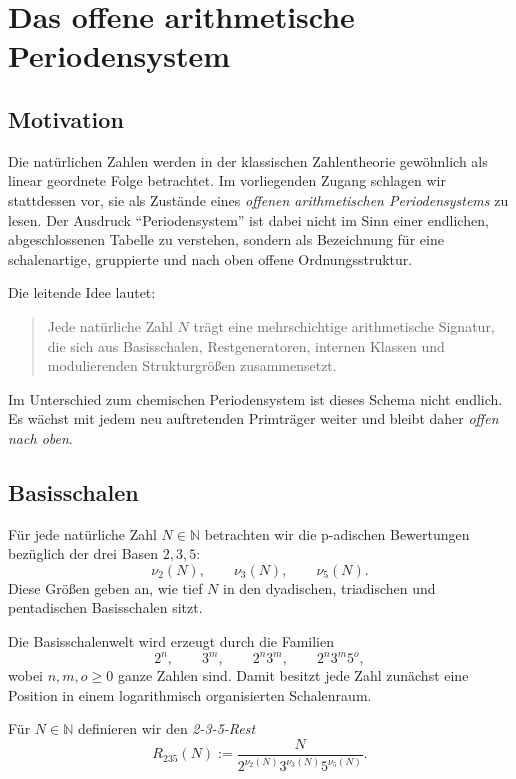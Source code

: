 \section{Das offene arithmetische Periodensystem}
\label{sec:offenes_periodensystem}

\subsection{Motivation}

Die natürlichen Zahlen werden in der klassischen Zahlentheorie gewöhnlich als linear geordnete Folge betrachtet. 
Im vorliegenden Zugang schlagen wir stattdessen vor, sie als Zustände eines \emph{offenen arithmetischen Periodensystems} zu lesen. 
Der Ausdruck ``Periodensystem'' ist dabei nicht im Sinn einer endlichen, abgeschlossenen Tabelle zu verstehen, sondern als Bezeichnung für eine schalenartige, gruppierte und nach oben offene Ordnungsstruktur.

Die leitende Idee lautet:
\begin{quote}
	Jede natürliche Zahl \(N\) trägt eine mehrschichtige arithmetische Signatur, die sich aus Basisschalen, Restgeneratoren, internen Klassen und modulierenden Strukturgrößen zusammensetzt.
\end{quote}

Im Unterschied zum chemischen Periodensystem ist dieses Schema nicht endlich. 
Es wächst mit jedem neu auftretenden Primträger weiter und bleibt daher \emph{offen nach oben}.

\subsection{Basisschalen}

Für jede natürliche Zahl \(N\in\mathbb{N}\) betrachten wir die p-adischen Bewertungen bezüglich der drei Basen \(2,3,5\):
\[
\nu_2(N),\qquad \nu_3(N),\qquad \nu_5(N).
\]
Diese Größen geben an, wie tief \(N\) in den dyadischen, triadischen und pentadischen Basisschalen sitzt.

Die Basisschalenwelt wird erzeugt durch die Familien
\[
2^n,\qquad 3^m,\qquad 2^n3^m,\qquad 2^n3^m5^o,
\]
wobei \(n,m,o\ge 0\) ganze Zahlen sind.
Damit besitzt jede Zahl zunächst eine Position in einem logarithmisch organisierten Schalenraum.

\begin{definition}[2-3-5-Rest]
	Für \(N\in\mathbb{N}\) definieren wir den \emph{2-3-5-Rest}
	\[
	R_{235}(N):=\frac{N}{2^{\nu_2(N)}3^{\nu_3(N)}5^{\nu_5(N)}}.
	\]
\end{definition}

